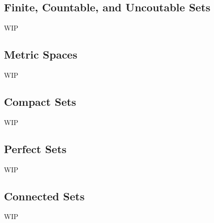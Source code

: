 \documentclass[../poma-note.tex]{subfiles}
\begin{document}
\subsection*{Finite, Countable, and Uncoutable Sets}

WIP

\subsection*{Metric Spaces}

WIP

\subsection*{Compact Sets}

WIP

\subsection*{Perfect Sets}

WIP

\subsection*{Connected Sets}

WIP
\end{document}
